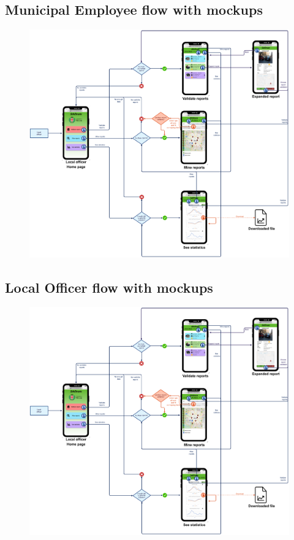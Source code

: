 			\subsection{Municipal Employee flow with mockups}
			\begin{figure}[!h]
				\centering
				\includegraphics[width=\textwidth]{images/Flow/MEFlow}
			\end{figure}
			\clearpage
			\subsection{Local Officer flow with mockups}
			\begin{figure}[!h]
				\centering
				\includegraphics[width=\textwidth]{images/Flow/LOFlow}
			\end{figure}
		